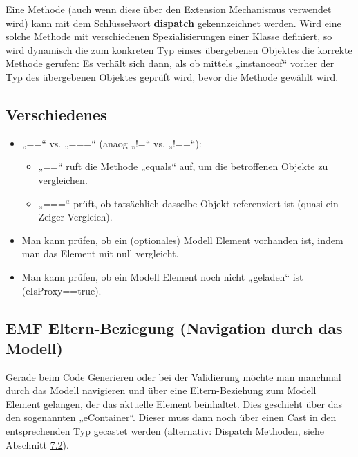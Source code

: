 \documentclass[]{article}
\providecommand{\tightlist}{%
  \setlength{\itemsep}{0pt}\setlength{\parskip}{0pt}}
\begin{document}
Eine Methode (auch wenn diese über den Extension Mechanismus verwendet
wird) kann mit dem Schlüsselwort \textbf{dispatch }gekennzeichnet
werden. Wird eine solche Methode mit verschiedenen Spezialisierungen
einer Klasse definiert, so wird dynamisch die zum konkreten Typ einses
übergebenen Objektes die korrekte Methode gerufen: Es verhält sich dann,
als ob mittels „instanceof`` vorher der Typ des übergebenen Objektes
geprüft wird, bevor die Methode gewählt wird.

\subsection[Verschiedenes]{\texorpdfstring{\protect\hypertarget{anchor-40}{}{}Verschiedenes}{Verschiedenes}}\label{verschiedenes}

\begin{itemize}
\item
  „==`` vs. „===`` (anaog „!=`` vs. „!==``):

  \begin{itemize}
  \tightlist
  \item
    „==`` ruft die Methode „equals`` auf, um die betroffenen Objekte zu
    vergleichen.
  \item
    „===`` prüft, ob tatsächlich dasselbe Objekt referenziert ist (quasi
    ein Zeiger-Vergleich).
  \end{itemize}
\item
  Man kann prüfen, ob ein (optionales) Modell Element vorhanden ist,
  indem man das Element mit null vergleicht.
\item
  Man kann prüfen, ob ein Modell Element noch nicht „geladen`` ist
  (eIsProxy==true).
\end{itemize}

\subsection[EMF Eltern-Beziegung (Navigation durch das
Modell)]{\texorpdfstring{\protect\hypertarget{anchor-41}{}{}EMF
Eltern-Beziegung (Navigation durch das
Modell)}{EMF Eltern-Beziegung (Navigation durch das Modell)}}\label{emf-eltern-beziegung-navigation-durch-das-modell}

Gerade beim Code Generieren oder bei der Validierung möchte man manchmal
durch das Modell navigieren und über eine Eltern-Beziehung zum Modell
Element gelangen, der das aktuelle Element beinhaltet. Dies geschieht
über das den sogenannten „eContainer``. Dieser muss dann noch über einen
Cast in den entsprechenden Typ gecastet werden (alternativ: Dispatch
Methoden, siehe Abschnitt \protect\hyperlink{anchor-38}{7.2}).
\end{document}
